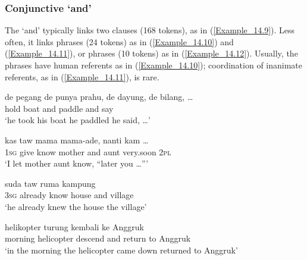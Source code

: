 \subsubsection[Conjunctive dang ‘and’]{Conjunctive  ‘and’}
\label{Para_14.2.1.2}
The   ‘and’ typically links two clauses (168 tokens), as in (\ref{Example_14.9}). Less often, it links  phrases (24 tokens) as in (\ref{Example_14.10}) and (\ref{Example_14.11}), or  phrases (10 tokens) as in (\ref{Example_14.12}). Usually, the  phrases have human referents as in (\ref{Example_14.10}); coordination of inanimate referents, as in (\ref{Example_14.11}), is rare.
%

\ea
\label{Example_14.9}
\gll     de pegang de punya prahu,  de dayung,  de bilang, {\ldots}\\  
  hold   boat and  paddle and  say\\
\glt ‘he took his boat  he paddled  he said, {\ldots}’ \textstyleExampleSource{[080917-008-NP.0018]}
\z

\ea\label{Example_14.10}
 {kas} {taw} {mama} {} {mama-ade,} {nanti} {kam} {\ldots}\\ %
 \textsc{1sg}  give  know  mother  and  aunt  very.soon  \textsc{2pl}  \\
\glt ‘I let mother  aunt know, ``later you {\ldots}''' \textstyleExampleSource{[080919-007-CvNP.0001]}
\z

\ea\label{Example_14.11}
 {suda} {taw} {ruma} {} {kampung}\\ %
 \textsc{3sg}  already  know  house  and  village\\
\glt ‘he already knew the house  the village’ \textstyleExampleSource{[080923-006-CvNP.0002]}
\z


\ea\label{Example_14.12}
 {helikopter} {turung} {} {kembali} {ke} {Anggruk}\\ %
 morning  helicopter  descend  and  return  to  Anggruk\\
\glt ‘in the morning the helicopter came down  returned to Anggruk’ \textstyleExampleSource{[081011-022-Cv.0228]}
\z

